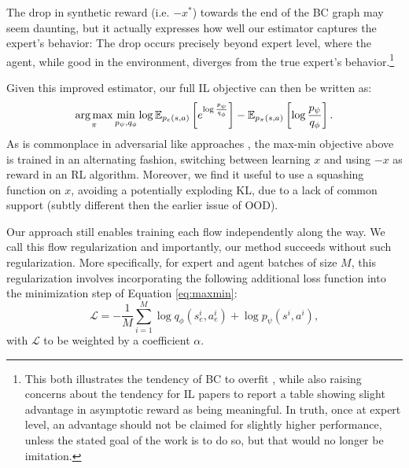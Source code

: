 The drop in synthetic reward (i.e. $-x^*$) towards the end of the BC graph may seem daunting, but it actually expresses how well our estimator captures the expert's behavior: The drop occurs precisely beyond expert level, where the agent, while good in the environment, diverges from the true expert's behavior.\footnote{ This both illustrates the tendency of BC to overfit \cite{li2022rethinking}, while also raising concerns about the tendency for IL papers to report a table showing slight advantage in asymptotic reward as being meaningful. In truth, once at expert level, an advantage should not be claimed for slightly higher performance, unless the stated goal of the work is to do so, but that would no longer be imitation.}



Given this improved estimator, our full IL objective can then be written as:
\begin{equation}\label{eq:maxmin} 
    \operatorname*{arg\,max}_{\pi} \min_{p_\psi, q_\phi}
    \log \mathbb{E}_{p_e(s,a)}\left[e^{\log \frac{p_\psi}{q_\phi}} \right] - \mathbb{E}_{p_\pi(s,a)}\left[\log \frac{p_\psi}{q_\phi}\right].
\end{equation}
As is commonplace in adversarial like approaches \cite{goodfellow2014generative, ho2016generative,kostrikov2019imitation}, the max-min objective above is trained in an alternating fashion, switching between learning $x$ and using $-x$ as reward in an RL algorithm. Moreover, we find it useful to use a squashing function on $x$, avoiding a potentially exploding KL, due to a lack of common support (subtly different then the earlier issue of OOD). 


Our approach still enables training each flow independently along the way. We call this flow regularization and importantly, our method succeeds without such regularization. More specifically, for expert and agent batches of size $M$, this
regularization involves incorporating the following additional loss function into the minimization step of Equation \ref{eq:maxmin}: 
\begin{equation}\label{eq:regularization}
\mathcal{L} = - \frac{1}{M} \sum_{i=1}^M \log  q_\phi(s_e^i,a_e^i) + \log  p_\psi(s^i,a^i),
\end{equation}
with $\mathcal{L}$ to be weighted by a coefficient $\alpha$.

